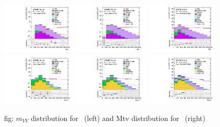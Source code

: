 \begin{figure}[ht]
    \centering
    	\includegraphics[width=0.32\textwidth]{figures/aQGC/MVV/Region_distMllJ_DSRVBSHP_BMin0_J0_incJet1_L2_T0_incFat1_Y6051_incTag1_Fat1_Prefitlog.pdf}
    \includegraphics[width=0.32\textwidth]{figures/aQGC/MVV/Region_distMllJ_DSRVBSLP_BMin0_J0_incJet1_L2_T0_incFat1_Y6051_incTag1_Fat1_Prefitlog.pdf}
  \includegraphics[width=0.32\textwidth]{figures/aQGC/MVV/Region_distMlljj_DSRVBSFid_BMin0_T0_Y6051_incTag1_J2_L2_incJet1_Prefitlog.pdf}
    	\includegraphics[width=0.32\textwidth]{figures/aQGC/MVV/Region_distMtvvJ_DSRVBSHP_BMin0_J0_incJet1_L0_T0_incFat1_Y6051_incTag1_Fat1_Prefitlog.pdf}
    \includegraphics[width=0.32\textwidth]{figures/aQGC/MVV/Region_distMtvvJ_DSRVBSLP_BMin0_J0_incJet1_L0_T0_incFat1_Y6051_incTag1_Fat1_Prefitlog.pdf}
 \includegraphics[width=0.32\textwidth]{figures/aQGC/MVV/Region_distMtvvjj_DSRVBSFid_BMin0_T0_Y6051_incTag1_J2_L0_incJet1_Prefitlog.pdf}
        \caption{fig: $m_{VV}$ distribution for \tlep\ (left) and Mtv distribution for \zlep\ (right)}
        \label{fig:mVVdist}
\end{figure}


